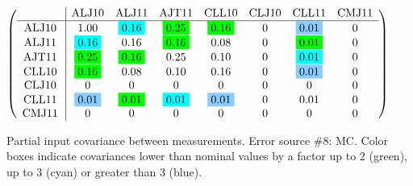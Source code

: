 \begin{table}[H]
\scriptsize
\begin{center}
\renewcommand{\arraystretch}{1.1}
\begin{math}\left(\begin{array}{c|ccccccc}
 & \mathrm{ALJ10} & 
\mathrm{ALJ11} & 
\mathrm{AJT11} & 
\mathrm{CLL10} & 
\mathrm{CLJ10} & 
\mathrm{CLL11} & 
\mathrm{CMJ11} \\
\hline
\mathrm{ALJ10} \hspace*{2pt} &       1.00 &  \colorbox{Cyan1}{$      0.16$} &  \colorbox{Green1}{$      0.25$} &  \colorbox{Green1}{$      0.16$} &  0 &  \colorbox{SkyBlue1}{$      0.01$} &  0 \\
\mathrm{ALJ11} \hspace*{2pt} &  \colorbox{Cyan1}{$      0.16$} &       0.16 &  \colorbox{Green1}{$      0.16$} &       0.08 &  0 &  \colorbox{Green1}{$      0.01$} &  0 \\
\mathrm{AJT11} \hspace*{2pt} &  \colorbox{Green1}{$      0.25$} &  \colorbox{Green1}{$      0.16$} &       0.25 &       0.10 &  0 &  \colorbox{Cyan1}{$      0.01$} &  0 \\
\mathrm{CLL10} \hspace*{2pt} &  \colorbox{Green1}{$      0.16$} &       0.08 &       0.10 &       0.16 &  0 &  \colorbox{SkyBlue1}{$      0.01$} &  0 \\
\mathrm{CLJ10} \hspace*{2pt} &  0 &  0 &  0 &  0 &  0 &  0 &  0 \\
\mathrm{CLL11} \hspace*{2pt} &  \colorbox{SkyBlue1}{$      0.01$} &  \colorbox{Green1}{$      0.01$} &  \colorbox{Cyan1}{$      0.01$} &  \colorbox{SkyBlue1}{$      0.01$} &  0 &       0.01 &  0 \\
\mathrm{CMJ11} \hspace*{2pt} &  0 &  0 &  0 &  0 &  0 &  0 &  0 \\
\end{array}\right)\end{math}
\caption{Partial input covariance between measurements. Error source \#8: MC. Color boxes indicate covariances lower than nominal values by a factor up to 2 (green), up to 3 (cyan) or greater than 3 (blue).}
\renewcommand{\arraystretch}{1}
\end{center}
\end{table}
